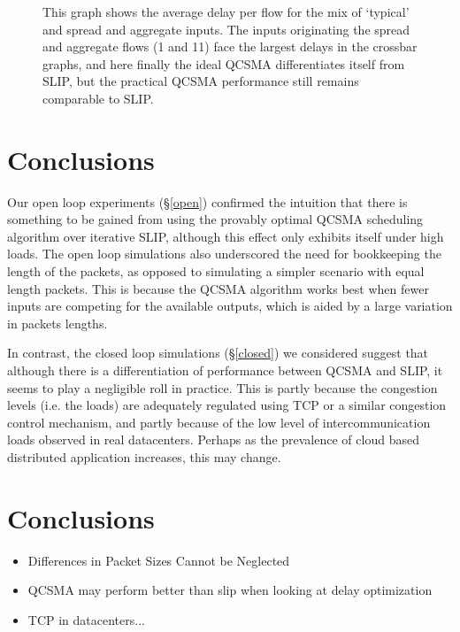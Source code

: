 \documentclass{IEEEtran}%
\begin{document}
\begin{figure}%
	\caption{This graph shows the average delay per flow for the mix of `typical' and spread and aggregate inputs.  The inputs originating the spread and aggregate flows (1 and 11) face the largest delays in the crossbar graphs, and here finally the ideal QCSMA differentiates itself from SLIP, but the practical QCSMA performance still remains comparable to SLIP.}
	\label{mixed_delay_matrix}
\end{figure}


\section{Conclusions}

Our open loop experiments (\S\ref{open}) confirmed the intuition that there is something to be gained from using the provably optimal QCSMA scheduling algorithm over iterative SLIP, although this effect only exhibits itself under high loads.  The open loop simulations also underscored the need for bookkeeping the length of the packets, as opposed to simulating a simpler scenario with equal length packets.  This is because the QCSMA algorithm works best when fewer inputs are competing for the available outputs, which is aided by a large variation in packets lengths.

In contrast, the closed loop simulations (\S \ref{closed}) we considered suggest that although there is a differentiation of performance between QCSMA and SLIP, it seems to play a negligible roll in practice.  This is partly because the congestion levels (i.e. the loads) are adequately regulated using TCP or a similar congestion control mechanism, and partly because of the low level of intercommunication loads observed in real datacenters.  Perhaps as the prevalence of cloud based distributed application increases, this may change.

\section{Conclusions}
\begin{itemize}
\item Differences in Packet Sizes Cannot be Neglected
\item QCSMA may perform better than slip when looking at delay optimization
\item TCP in datacenters...
\end{itemize}
\end{document}
